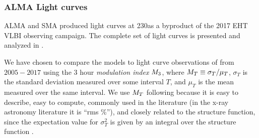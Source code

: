 
\subsubsection{ALMA Light curves}


ALMA and SMA produced \sgra light curves at 230\GHz as a byproduct of the 2017 EHT VLBI observing campaign. The complete set of light curves is presented and analyzed in \cite{Wielgus2022}.

We have chosen to compare the models to light curve observations of \sgra from $2005-2017$ using the 3 hour {\em modulation index} $M_{3}$, where $M_{T} \equiv \sigma_T/\mu_T$, $\sigma_T$ is the standard deviation measured over some interval $T$, and $\mu_T$ is the mean measured over the same interval.  We use $M_{T}$ following \citet{2015ApJ...812..103C} because it is easy to describe, easy to compute, commonly used in the literature (in the x-ray astronomy literature it is ``rms \%''), and closely related to the structure function, since the expectation value for $\sigma_T^2$ is given by an integral over the structure function \citep[see][]{Lee_2022}.

